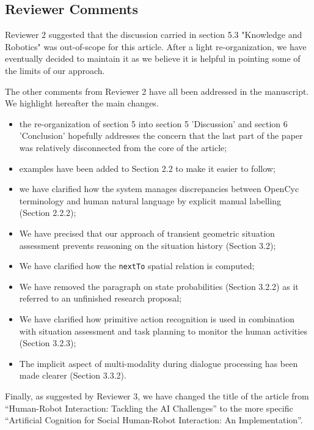 \documentclass{article}
\begin{document}
\subsection*{Reviewer Comments}

Reviewer 2 suggested that the discussion carried in section 5.3 "Knowledge and
Robotics" was out-of-scope for this article. After a light re-organization,
we have eventually decided to maintain it as we believe it is helpful in
pointing some of the limits of our approach.

The other comments from Reviewer 2 have all been addressed in the manuscript.
We highlight hereafter the main changes.

\begin{itemize}
    \item the re-organization of section 5 into section 5 'Discussion' and
        section 6 'Conclusion' hopefully addresses the concern that the last part of the
        paper was relatively disconnected from the core of the article;
    \item examples have been added to Section 2.2 to make it easier to follow;
    \item we have clarified how the system manages discrepancies between OpenCyc
        terminology and human natural language by explicit manual labelling
        (Section 2.2.2);
    \item We have precised that our approach of transient geometric situation assessment
        prevents reasoning on the situation history (Section 3.2);
    \item We have clarified how the {\tt nextTo} spatial relation is computed;
    \item We have removed the paragraph on state probabilities (Section 3.2.2)
        as it referred to an unfinished research proposal;
    \item We have clarified how primitive action recognition is used in
        combination with situation assessment and task planning to monitor the
        human activities (Section 3.2.3);
    \item The implicit aspect of multi-modality during dialogue processing has
        been made clearer (Section 3.3.2).
\end{itemize}


Finally, as suggested by Reviewer 3, we have changed the title of the article
from ``Human-Robot Interaction: Tackling the AI Challenges'' to the more
specific ``Artificial Cognition for Social Human-Robot Interaction: An
Implementation''.




\end{document}
